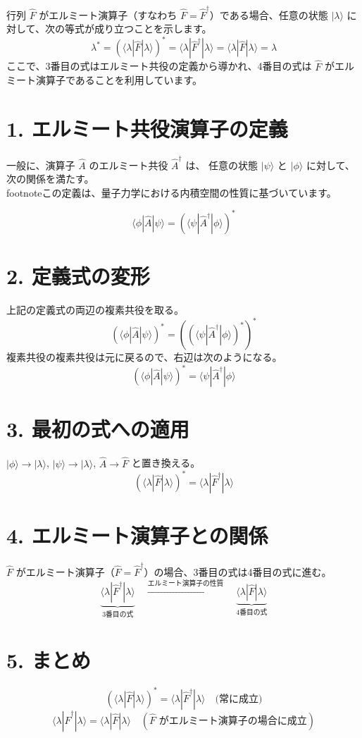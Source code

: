 \documentclass{ltjsarticle}
\begin{document}
行列 $\hat{F}$ がエルミート演算子（すなわち $\hat{F} = \hat{F}^{\dagger}$）である場合、任意の状態 $|\lambda\rangle$ に対して、次の等式が成り立つことを示します。 \\
$$
\lambda^{*} = \left( \langle\lambda|\hat{F}|\lambda\rangle \right)^{*} = \langle\lambda|\hat{F}^{\dagger}|\lambda\rangle = \langle\lambda|\hat{F}|\lambda\rangle = \lambda
$$
ここで、3番目の式はエルミート共役の定義から導かれ、4番目の式は $\hat{F}$ がエルミート演算子であることを利用しています。 \\


\section*{1. エルミート共役演算子の定義}
一般に、演算子 $\hat{A}$ のエルミート共役 $\hat{A}^{\dagger}$ は、
任意の状態 $|\psi\rangle$ と $|\phi\rangle$ に対して、次の関係を満たす。 \\
footnote{この定義は、量子力学における内積空間の性質に基づいています。}

$$
\langle\phi|\hat{A}|\psi\rangle = \left( \langle\psi|\hat{A}^{\dagger}|\phi\rangle \right)^{*}
$$


\section*{2. 定義式の変形}
上記の定義式の両辺の複素共役を取る。 \\
$$
\left( \langle\phi|\hat{A}|\psi\rangle \right)^{*} = \left( \left( \langle\psi|\hat{A}^{\dagger}|\phi\rangle \right)^{*} \right)^{*}
$$
複素共役の複素共役は元に戻るので、右辺は次のようになる。 \\
$$
\left( \langle\phi|\hat{A}|\psi\rangle \right)^{*} = \langle\psi|\hat{A}^{\dagger}|\phi\rangle
$$


\section*{3. 最初の式への適用}
 $|\phi\rangle \to |\lambda\rangle$, $|\psi\rangle \to |\lambda\rangle$, $\hat{A} \to \hat{F}$ と置き換える。 \\
$$
\left( \langle\lambda|\hat{F}|\lambda\rangle \right)^{*} = \langle\lambda|\hat{F}^{\dagger}|\lambda\rangle
$$


\section*{4. エルミート演算子との関係}
$\hat{F}$ がエルミート演算子（$\hat{F} = \hat{F}^{\dagger}$）の場合、3番目の式は4番目の式に進む。 \\
$$
\underbrace{\langle\lambda|\hat{F}^{\dagger}|\lambda\rangle}_{\text{3番目の式}} \quad \xrightarrow{\text{エルミート演算子の性質}} \quad \underbrace{\langle\lambda|\hat{F}|\lambda\rangle}_{\text{4番目の式}}
$$


\section*{5. まとめ}
$$
\left( \langle\lambda|\hat{F}|\lambda\rangle \right)^{*} = \langle\lambda|\hat{F}^{\dagger}|\lambda\rangle \quad \text{(常に成立)}
$$
$$
\langle\lambda|\hat{F}^{\dagger}|\lambda\rangle = \langle\lambda|\hat{F}|\lambda\rangle \quad (\hat{F} \text{ がエルミート演算子の場合に成立})
$$
\end{document}
